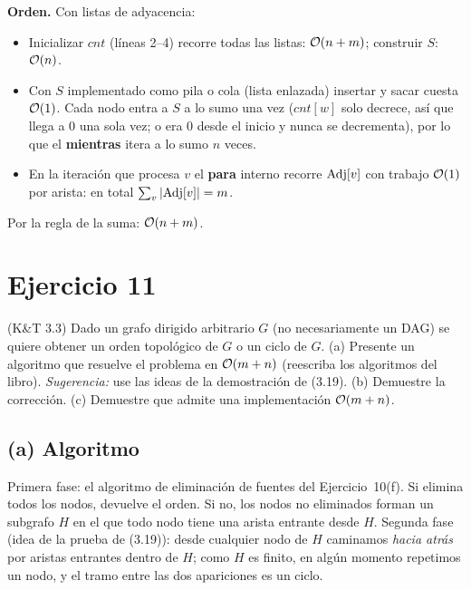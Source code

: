 \textbf{Orden.} Con listas de adyacencia:
\begin{itemize}[nosep]
\item Inicializar $cnt$ (líneas 2--4) recorre todas las listas: $\mathcal{O}(n+m)$; construir $S$: $\mathcal{O}(n)$.
\item Con $S$ implementado como pila o cola (lista enlazada) insertar y sacar cuesta $\mathcal{O}(1)$. Cada nodo
entra a $S$ a lo sumo una vez ($cnt[w]$ solo decrece, así que llega a 0 una sola vez; o era 0 desde el
inicio y nunca se decrementa), por lo que el \textbf{mientras} itera a lo sumo $n$ veces.
\item En la iteración que procesa $v$ el \textbf{para} interno recorre $\mathrm{Adj}[v]$ con trabajo $\mathcal{O}(1)$ por
arista: en total $\sum_v|\mathrm{Adj}[v]|=m$.
\end{itemize}
Por la regla de la suma: $\mathcal{O}(n+m)$.

\section{Ejercicio 11}
\begin{enunciado}
(K\&T 3.3) Dado un grafo dirigido arbitrario $G$ (no necesariamente un DAG) se quiere obtener un orden
topológico de $G$ o un ciclo de $G$.
(a) Presente un algoritmo que resuelve el problema en $\mathcal{O}(m+n)$ (reescriba los algoritmos del libro).
\emph{Sugerencia:} use las ideas de la demostración de (3.19).
(b) Demuestre la corrección.
(c) Demuestre que admite una implementación $\mathcal{O}(m+n)$.
\end{enunciado}

\subsection*{(a) Algoritmo}
Primera fase: el algoritmo de eliminación de fuentes del Ejercicio~10(f). Si elimina todos los nodos,
devuelve el orden. Si no, los nodos no eliminados forman un subgrafo $H$ en el que todo nodo tiene una
arista entrante desde $H$. Segunda fase (idea de la prueba de (3.19)): desde cualquier nodo de $H$
caminamos \emph{hacia atrás} por aristas entrantes dentro de $H$; como $H$ es finito, en algún momento
repetimos un nodo, y el tramo entre las dos apariciones es un ciclo.


